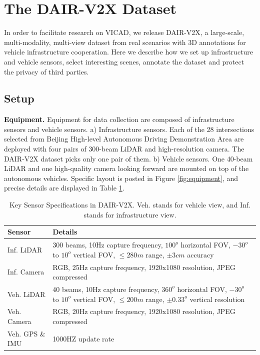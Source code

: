 \section{The DAIR-V2X Dataset}
In order to facilitate research on VICAD, we release DAIR-V2X, a large-scale, multi-modality, multi-view dataset from real scenarios with 3D annotations for vehicle infrastructure cooperation.
Here we describe how we set up infrastructure and vehicle sensors, select interesting scenes, annotate the dataset and protect the privacy of third parties.


\subsection{Setup}
\noindent \textbf{Equipment.}
Equipment for data collection are composed of infrastructure sensors and vehicle sensors.
a) Infrastructure sensors. Each of the 28 intersections selected from Beijing High-level Autonomous Driving Demonstration Area are deployed with four pairs of 300-beam LiDAR and high-resolution camera. 
The DAIR-V2X dataset picks only one pair of them.
b) Vehicle sensors. One 40-beam LiDAR and one high-quality camera looking forward are mounted on top of the autonomous vehicles. 
Specific layout is posted in Figure \ref{fig:equipment}, and precise details are displayed in Table \ref{tab: sensors}.
\begin{table}
\caption{Key Sensor Specifications in DAIR-V2X. Veh. stands for vehicle view, and Inf. stands for infrastructure view.}
\label{tab: sensors}
\small
\begin{tabular}{lp{5.4cm}}
\hline
\textbf{Sensor} & \textbf{Details} \\
\hline
Inf. LiDAR & 300 beams, 10Hz capture frequency, $100^o$ horizontal FOV, $-30^o$ to $10^o$ vertical FOV, $\leq 280m$ range, $\pm 3cm$ accuracy  \\
Inf. Camera & RGB, 25Hz capture frequency, 1920x1080 resolution, JPEG compressed \\
\hline
Veh. LiDAR & 40 beams, 10Hz capture frequency, $360^{o}$ horizontal FOV, $-30^o$ to $10^o$ vertical FOV, $\leq 200m$ range, $\pm 0.33^{o}$ vertical resolution \\
Veh. Camera & RGB, 20Hz capture frequency, 1920x1080 resolution, JPEG compressed \\
Veh. GPS \& IMU & 1000HZ update rate \\
\hline
\end{tabular}
\end{table} \\

